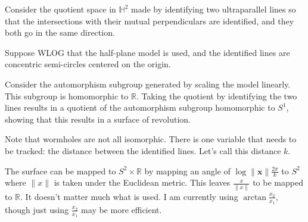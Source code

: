 \documentclass[12pt]{amsart}
\begin{document}
Consider the quotient space in $\mathbb{H}^2$ made by identifying two ultraparallel lines so that the intersections with their mutual perpendiculars are identified, and they both go in the same direction.

Suppose WLOG that the half-plane model is used, and the identified lines are concentric semi-circles centered on the origin.

Consider the automorphism subgroup generated by scaling the model linearly. This subgroup is homomorphic to $\mathbb{R}$. Taking the quotient by identifying the two lines results in a quotient of the automorphism subgroup homomorphic to $S^1$, showing that this results in a surface of revolution.

Note that wormholes are not all isomorphic. There is one variable that needs to be tracked: the distance between the identified lines. Let's call this distance $k$.

The surface can be mapped to $S^2 \times \mathbb{R}$ by mapping an angle of $\log\|\textbf{x}\|\frac{2\pi}{k}$ to $S^2$ where $\|x\|$ is taken under the Euclidean metric. This leaves $\frac{x}{\|x\|}$ to be mapped to $\mathbb{R}$. It doesn't matter much what is used. I am currently using $\arctan\frac{x_2}{x_1}$, though just using $\frac{x_2}{x_1}$ may be more efficient.

\end{document}
